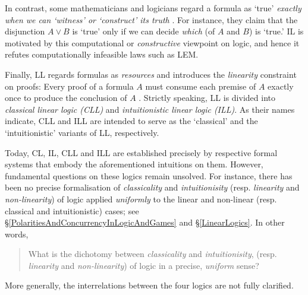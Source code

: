 \documentclass[a4paper]{article}
\theoremstyle{definition}
\theoremstyle{theorem}
\theoremstyle{remark}
\begin{document}
In contrast, some mathematicians and logicians regard a formula as `true' \emph{exactly when we can `witness' or `construct' its truth} \cite{troelstra1988constructivism}.
For instance, they claim that the disjunction $A \vee B$ is `true' only if we can decide \emph{which} (of $A$ and $B$) is `true.'
IL is motivated by this computational or \emph{constructive} viewpoint on logic, and hence it refutes computationally infeasible laws such as LEM.

Finally, LL regards formulas as \emph{resources} and introduces the \emph{linearity} constraint on proofs: Every proof of a formula $A$ must consume each premise of $A$ exactly once to produce the conclusion of $A$ \cite{lafont1988introduction}.
Strictly speaking, LL is divided into \emph{classical linear logic (CLL)} and \emph{intuitionistic linear logic (ILL)}.
As their names indicate, CLL and ILL are intended to serve as the `classical' and the `intuitionistic' variants of LL, respectively.


Today, CL, IL, CLL and ILL are established precisely by respective formal systems \cite{troelstra2000basic,girard1995linear} that embody the aforementioned intuitions on them.
However, fundamental questions on these logics remain unsolved.
For instance, there has been no precise formalisation of \emph{classicality} and \emph{intuitionisity} (resp. \emph{linearity} and \emph{non-linearity}) of logic applied \emph{uniformly} to the linear and non-linear (resp. classical and intuitionistic) cases; see \S\ref{PolaritiesAndConcurrencyInLogicAndGames} and \S\ref{LinearLogics}.
In other words,
\begin{quote}
What is the dichotomy between \emph{classicality} and \emph{intuitionisity}, (resp. \emph{linearity} and \emph{non-linearity}) of logic in a precise, \emph{uniform} sense?
\end{quote}
More generally, the interrelations between the four logics are not fully clarified.
\end{document}
